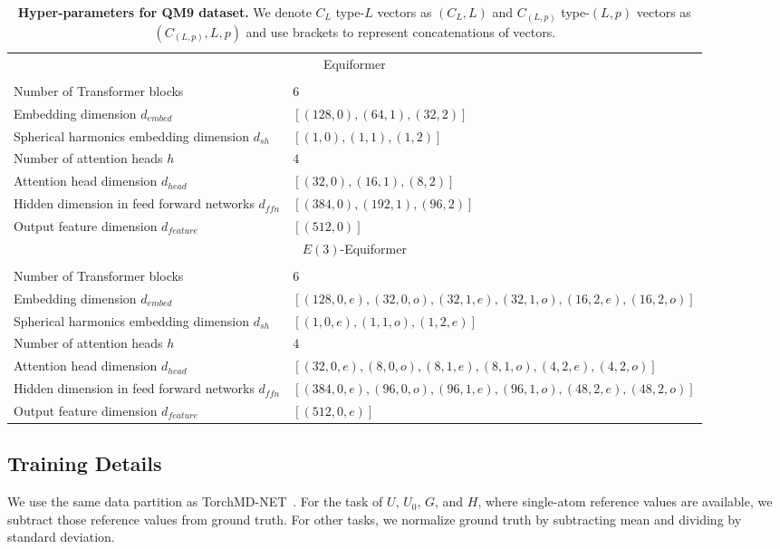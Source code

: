 \begin{table}[]
{\begin{tabular}{ll}
\multicolumn{2}{c}{Equiformer} \\
\\
Number of Transformer blocks & $6$ \\
Embedding dimension $d_{embed}$ & $[(128, 0), (64, 1), (32, 2)]$ \\
Spherical harmonics embedding dimension $d_{sh}$ & $[(1, 0), (1, 1), (1, 2)]$ \\
Number of attention heads $h$ & $4$ \\
Attention head dimension $d_{head}$ & $[(32, 0), (16, 1), (8, 2)]$\\
Hidden dimension in feed forward networks $d_{ffn}$ & $[(384, 0), (192, 1) , (96, 2)]$ \\
Output feature dimension $d_{feature}$ & $[(512, 0)]$\\

\midrule[0.6pt]

\multicolumn{2}{c}{$E(3)$-Equiformer} \\
\\
Number of Transformer blocks & $6$ \\
Embedding dimension $d_{embed}$ & $[(128, 0, e), (32, 0, o), (32, 1, e), (32, 1, o), (16, 2, e), (16, 2, o)]$ \\
Spherical harmonics embedding dimension $d_{sh}$ & $[(1, 0, e), (1, 1, o), (1, 2, e)]$ \\
Number of attention heads $h$ & $4$ \\
Attention head dimension $d_{head}$ & $[(32, 0, e), (8, 0, o), (8, 1, e), (8, 1, o), (4, 2, e), (4, 2, o)]$ \\
Hidden dimension in feed forward networks $d_{ffn}$ & $[(384, 0, e), (96, 0, o), (96, 1, e), (96, 1, o), (48, 2, e), (48, 2, o)]$ \\
Output feature dimension $d_{feature}$ & $[(512, 0, e)]$\\
\bottomrule[1.2pt]
\end{tabular}
}
\vspace{-2mm}
\caption{\textbf{Hyper-parameters for QM9 dataset.}
We denote $C_L$ type-$L$ vectors as $(C_L, L)$ and $C_{(L, p)}$ type-$(L, p)$ vectors as $(C_{(L, p)}, L, p)$ and use brackets to represent concatenations of vectors.
}
\label{appendix:tab:qm9}
\end{table}


\subsection{Training Details}
\label{appendix:subsec:qm9_training_details}
We use the same data partition as TorchMD-NET~\citep{torchmd_net}.
For the task of $U$, $U_0$, $G$, and $H$, where single-atom reference values are available, we subtract those reference values from ground truth. 
For other tasks, we normalize ground truth by subtracting mean and dividing by standard deviation.


